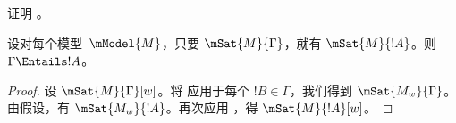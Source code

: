 \documentclass[../../../include/open-logic-section]{subfiles}
\begin{document}
\begin{prob}
  证明 。
\end{prob}

\begin{prop}
  设对每个模型~$\mModel{M}$，只要 $\mSat{M}{\Gamma}$，就有
  $\mSat{M}{!A}$。则 $\Gamma \Entails !A$。
\end{prop}

\begin{proof}
  设 $\mSat{M}{\Gamma}[w]$。将  应用于每个
  $!B \in \Gamma$，我们得到 $\mSat{M_w}{\Gamma}$。由假设，有
  $\mSat{M_w}{!A}$。再次应用 ，得
  $\mSat{M}{!A}[w]$。
\end{proof}
\end{document}
